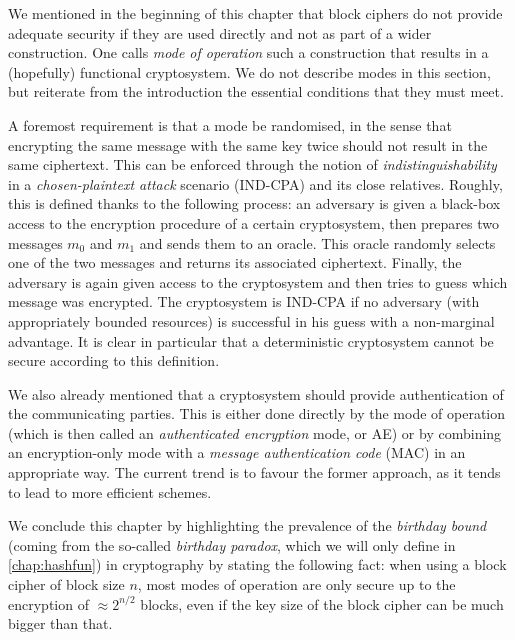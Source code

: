 We mentioned in the beginning of this chapter that block ciphers do not provide adequate security if they are used directly and not as part of a wider construction. One calls \emph{mode
of operation} such a construction that results in a (hopefully) functional cryptosystem. We do not describe modes in this section, but reiterate from the introduction the essential conditions that they
must meet.

A foremost requirement is that a mode be randomised, in the sense that encrypting the same message with the same key twice should not result in the same ciphertext. This can be
enforced through the notion of \emph{indistinguishability} in a \emph{chosen-plaintext attack} scenario (\textsf{IND-CPA}) and its close relatives. Roughly, this is
defined thanks to the following process: an adversary is given a black-box access to the encryption procedure of a certain cryptosystem, then prepares two messages $m_0$ and $m_1$ and sends them to an oracle. This oracle randomly selects one of the two messages and
returns its associated ciphertext. Finally, the adversary is again given access to the cryptosystem and then tries to guess which message was encrypted. The cryptosystem is \textsf{IND-CPA}
if no adversary (with appropriately bounded resources) is successful in his guess with a non-marginal advantage. It is clear in particular that a deterministic cryptosystem cannot be secure according
to this definition.

We also already mentioned that a cryptosystem should provide authentication of the communicating parties. This is either done directly by the mode of operation (which is then
called an \emph{authenticated encryption} mode, or AE) or by combining an encryption-only mode with a \emph{message authentication code} (MAC) in an appropriate way. The current
trend is to favour the former approach, as it tends to lead to more efficient schemes.

We conclude this chapter by highlighting the prevalence of the \emph{birthday bound} (coming from the so-called \emph{birthday paradox}, which we will
only define in \autoref{chap:hashfun}) in cryptography by stating the following fact: when using a block cipher of block size $n$, most modes of operation are only
secure up to the encryption of $\approx 2^{n/2}$ blocks, even if the key size of the block cipher can be much bigger than that.
 

